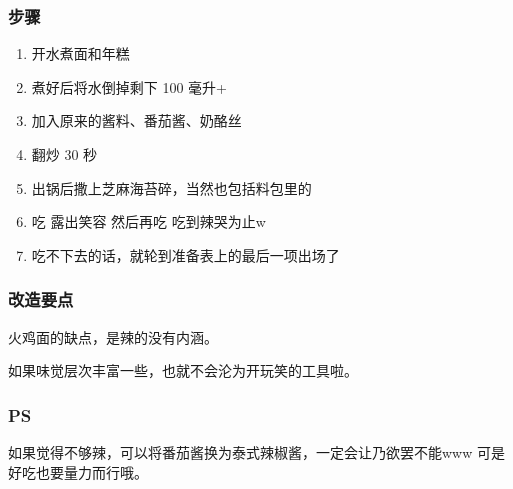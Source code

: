 \documentclass[12pt, a4paper]{ctexart}
\begin{document}
\subsubsection{步骤}
\begin{enumerate}[start=0]
    \item{开水煮面和年糕}
    \item{煮好后将水倒掉剩下 100 毫升+}
    \item{加入原来的酱料、番茄酱、奶酪丝}
    \item{翻炒 30 秒}
    \item{出锅后撒上芝麻海苔碎，当然也包括料包里的}
    \item{吃 露出笑容 然后再吃 吃到辣哭为止w}
    \item{吃不下去的话，就轮到准备表上的最后一项出场了}
\end{enumerate}

\subsubsection{改造要点}
火鸡面的缺点，是辣的没有内涵。

如果味觉层次丰富一些，也就不会沦为开玩笑的工具啦。

\subsubsection{PS}
如果觉得不够辣，可以将番茄酱换为泰式辣椒酱，一定会让乃欲罢不能www 可是好吃也要量力而行哦。
\end{document}
